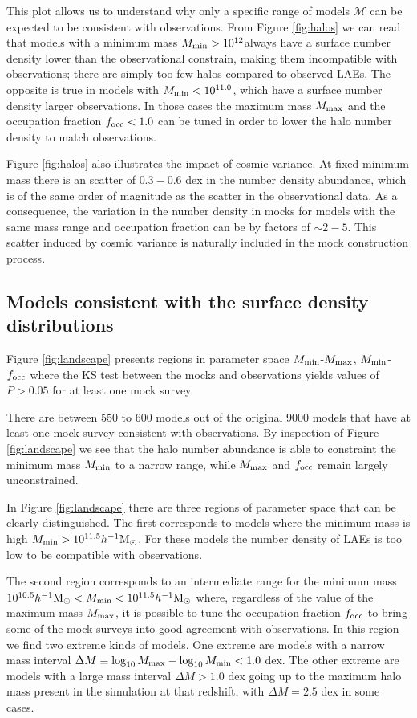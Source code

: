 \documentclass[usenatbib]{mn2e}
\newcommand{\hMsun}{{\ifmmode{h^{-1}{\rm
        {M_{\odot}}}}\else{$h^{-1}{\rm{M_{\odot}}}$}\fi}}
\begin{document}
This plot allows us to understand why only a specific range of
models ${\mathcal M}$ can be expected to be consistent with
observations. From Figure \ref{fig:halos} we can read that models with
a minimum mass $M_{\rm min}>10^{12}$\hMsun always have a
surface number density lower than the observational constrain, making
them incompatible with observations; there are simply too few halos
compared to observed LAEs. The opposite is true in models with $M_{\rm
  min}<10^{11.0}$\hMsun, which have a surface number density larger
observations. In those cases the maximum mass $M_{\rm max}$ and the
occupation fraction $f_{\rm occ}<1.0$  can be tuned in order to lower
the halo number density to match observations.   

Figure \ref{fig:halos} also illustrates the impact of cosmic
variance. At fixed minimum mass there is an scatter of $0.3-0.6$ dex
in the number density abundance, which is of the same order of
magnitude as the scatter in the observational data.  As a consequence,
the variation in the number density in mocks for models with the same
mass range and occupation fraction can be by factors of $\sim 2-5$.
This scatter induced by cosmic variance is naturally included in the
mock construction process. 


\subsection{Models consistent with the surface density distributions}


Figure \ref{fig:landscape} presents regions in parameter space $M_{\rm
min}$-$M_{\rm max}$, $M_{\rm min}$-$f_{\rm occ}$ where the KS test
between the mocks and observations yields values of $P>0.05$ for at
least one mock survey.

There are between $550$ to $600$ models out of the original
$9000$ models that have at least one mock survey consistent with
observations. By inspection of Figure \ref{fig:landscape} we see that
the halo number abundance is able to constraint the minimum mass
$M_{\rm min}$ to a narrow range, while $M_{\rm max}$ and $f_{\rm occ}$
remain largely unconstrained. 

In Figure \ref{fig:landscape} there are three regions of parameter
space that can be clearly distinguished. The first corresponds to
models where the minimum mass is high $M_{\rm min}>
10^{11.5}\hMsun$.  For these models the number density of LAEs is too low
to be compatible with observations. 

The second region corresponds to an intermediate range for the minimum
mass $10^{10.5}\hMsun < M_{\rm min}< 10^{11.5}\hMsun$ where,
regardless of the value of the maximum mass $M_{\rm max}$, it is
possible to tune the occupation fraction $f_{\rm occ}$ to bring some
of the mock surveys into good agreement with observations. In this
region we find two extreme kinds of models. One extreme are models
with a narrow mass interval $\Delta M\equiv \log_{10} M_{\rm max}
- \log_{10}M_{\rm  min} <1.0$ dex. The other extreme are models with a
large mass interval $\Delta M>1.0$ dex going up to the maximum halo
mass present in the simulation at that redshift, with $\Delta M = 2.5$
dex in some cases. 
  
\end{document}
